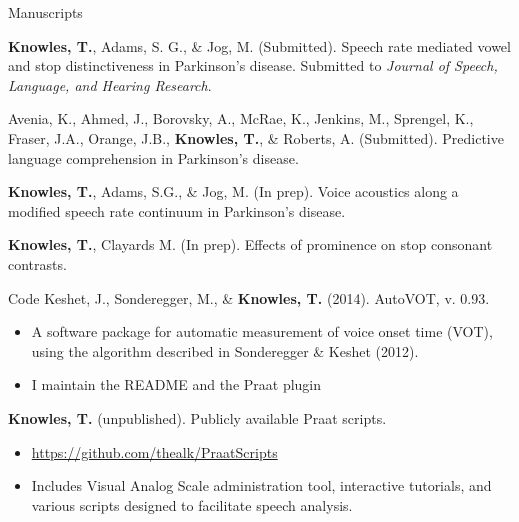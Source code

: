\documentclass{resume} %
\begin{document}
\begin{rSection}{Manuscripts}

{\bf Knowles, T.}, Adams, S. G., \& Jog, M. (Submitted). Speech rate mediated vowel and stop distinctiveness in Parkinson’s disease. Submitted to \emph{Journal of Speech, Language, and Hearing Research}.
	
Avenia, K., Ahmed, J., Borovsky, A., McRae, K., Jenkins, M., Sprengel, K., Fraser, J.A., Orange, J.B., {\bf Knowles, T.}, \& Roberts, A. (Submitted). Predictive language comprehension in Parkinson’s disease.

{\bf Knowles, T.}, Adams, S.G., \& Jog, M. (In prep). Voice acoustics along a modified speech rate continuum in Parkinson's disease.

{\bf Knowles, T.}, Clayards M. (In prep). Effects of prominence on stop consonant contrasts.

\end{rSection}



\begin{rSection}{Code}
	Keshet, J., Sonderegger, M., \& {\bf Knowles, T.} (2014). AutoVOT, v. 0.93.
	\begin{itemize}
			\renewcommand\labelitemi{$\cdot$}
		\item A software package for automatic measurement of voice onset time (VOT), using the algorithm described in Sonderegger \& Keshet (2012).
		\item I maintain the README and the Praat plugin
	\end{itemize}
	
	{\bf Knowles, T.} (unpublished). Publicly available Praat scripts.
	\begin{itemize}
			\renewcommand\labelitemi{$\cdot$}
		\item \url{https://github.com/thealk/PraatScripts}
		\item Includes Visual Analog Scale administration tool, interactive tutorials, and various scripts designed to facilitate speech analysis.
	\end{itemize}
\end{rSection}


\end{document}
